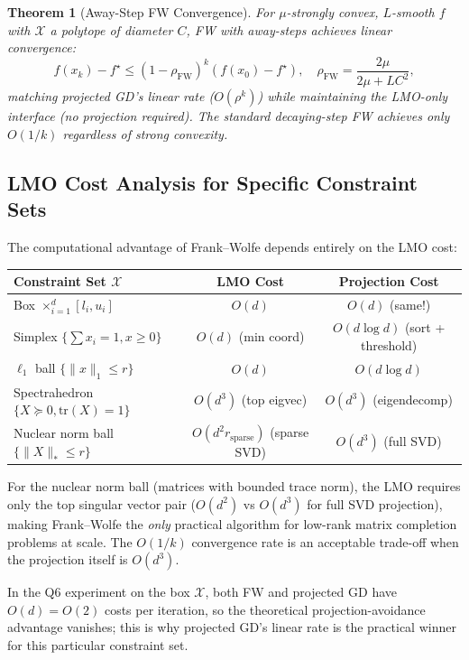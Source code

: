 \documentclass[11pt,a4paper]{article}
\newtheorem{theorem}{Theorem}[section]
\theoremstyle{definition}
\begin{document}
\begin{theorem}[Away-Step FW Convergence]
For $\mu$-strongly convex, $L$-smooth $f$ with $\mathcal{X}$ a polytope of diameter $C$, FW with away-steps achieves linear convergence:
\begin{equation}
f(x_k) - f^{\star} \leq (1 - \rho_{\text{FW}})^k (f(x_0) - f^{\star}), \quad \rho_{\text{FW}} = \frac{2\mu}{2\mu + LC^2},
\end{equation}
matching projected GD's linear rate ($O(\rho^k)$) while maintaining the LMO-only interface (no projection required). The standard decaying-step FW achieves only $O(1/k)$ regardless of strong convexity.
\end{theorem}

\subsection{LMO Cost Analysis for Specific Constraint Sets}

The computational advantage of Frank--Wolfe depends entirely on the LMO cost:
\begin{center}
\begin{tabular}{lcc}
\toprule
\textbf{Constraint Set $\mathcal{X}$} & \textbf{LMO Cost} & \textbf{Projection Cost} \\
\midrule
Box $\times_{i=1}^d [l_i, u_i]$ & $O(d)$ & $O(d)$ (same!) \\
Simplex $\{\sum x_i = 1, x \geq 0\}$ & $O(d)$ (min coord) & $O(d \log d)$ (sort + threshold) \\
$\ell_1$ ball $\{\|x\|_1 \leq r\}$ & $O(d)$ & $O(d \log d)$ \\
Spectrahedron $\{X \succeq 0, \text{tr}(X) = 1\}$ & $O(d^3)$ (top eigvec) & $O(d^3)$ (eigendecomp) \\
Nuclear norm ball $\{\|X\|_* \leq r\}$ & $O(d^2 r_{\text{sparse}})$ (sparse SVD) & $O(d^3)$ (full SVD) \\
\bottomrule
\end{tabular}
\end{center}
For the nuclear norm ball (matrices with bounded trace norm), the LMO requires only the top singular vector pair ($O(d^2)$ vs $O(d^3)$ for full SVD projection), making Frank--Wolfe the \emph{only} practical algorithm for low-rank matrix completion problems at scale. The $O(1/k)$ convergence rate is an acceptable trade-off when the projection itself is $O(d^3)$.

In the Q6 experiment on the box $\mathcal{X}$, both FW and projected GD have $O(d) = O(2)$ costs per iteration, so the theoretical projection-avoidance advantage vanishes; this is why projected GD's linear rate is the practical winner for this particular constraint set.
\end{document}
